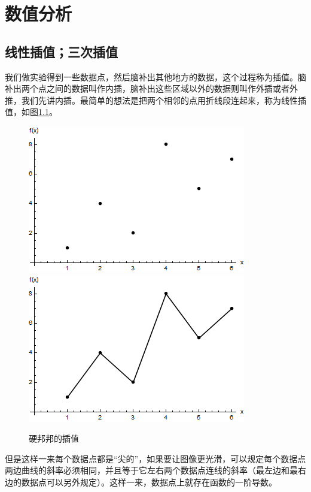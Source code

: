 \chapter{数值分析}
\section{线性插值；三次插值}
我们做实验得到一些数据点，然后脑补出其他地方的数据，这个过程称为插值。脑补出两个点之间的数据叫作内插，脑补出这些区域以外的数据则叫作外插或者外推，我们先讲内插。最简单的想法是把两个相邻的点用折线段连起来，称为线性插值，如图\ref{fig-disc-data}。
\begin{figure}[htb]
\centering
\includegraphics[scale=0.5]{fig/disc-data.png}
\includegraphics[scale=0.5]{fig/disc-data-line.png}
\caption{硬邦邦的插值}
\label{fig-disc-data}
\end{figure}

但是这样一来每个数据点都是“尖的”，如果要让图像更光滑，可以规定每个数据点两边曲线的斜率必须相同，并且等于它左右两个数据点连线的斜率（最左边和最右边的数据点可以另外规定）。这样一来，数据点上就存在函数的一阶导数。

